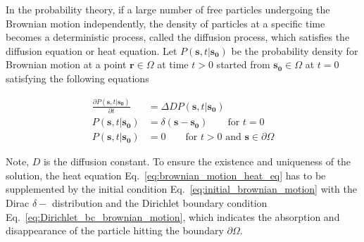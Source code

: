 In the probability theory, if a large number of free particles
undergoing the Brownian motion independently, the density of particles
at a specific time becomes a deterministic process, called the
diffusion process, which satisfies the diffusion equation
\cite{kac1947random}\cite{varadhan1980lectures} or heat equation. Let
$P(\bm{s}, t | \bm{s_0})$ be the probability density for Brownian
motion at a point $\bm{r} \in \Omega$ at time $t>0$ started from
$\bm{s_0} \in \Omega$ at $t=0$ satisfying the following equations


\begin{align}
  \frac{\partial P(\bm{s}, t | \bm{s_0})}{\partial t} &= \Delta D P(\bm{s}, t | \bm{s_0}) \label{eq:brownian_motion_heat_eq} \\
  P(\bm{s}, t| \bm{s_0}) &= \delta(\bm{s} - \bm{s_0}) \qquad \text{for $t=0$} \label{eq:initial_brownian_motion} \\
  P(\bm{s}, t| \bm{s_0}) &= 0 \qquad \text{for $t>0$ and $\bm{s} \in \partial \Omega$} \label{eq:Dirichlet_bc_brownian_motion}
\end{align}


Note, $D$ is the diffusion constant. To ensure the existence and
uniqueness of the solution, the heat equation
Eq.~\ref{eq:brownian_motion_heat_eq} has to be supplemented by the
initial condition Eq.~\ref{eq:initial_brownian_motion} with the Dirac
$\delta -$ distribution and the Dirichlet boundary condition
Eq.~\ref{eq:Dirichlet_bc_brownian_motion}, which indicates the
absorption and disappearance of the particle hitting the boundary
$\partial \Omega$.


\subsubsection{}


